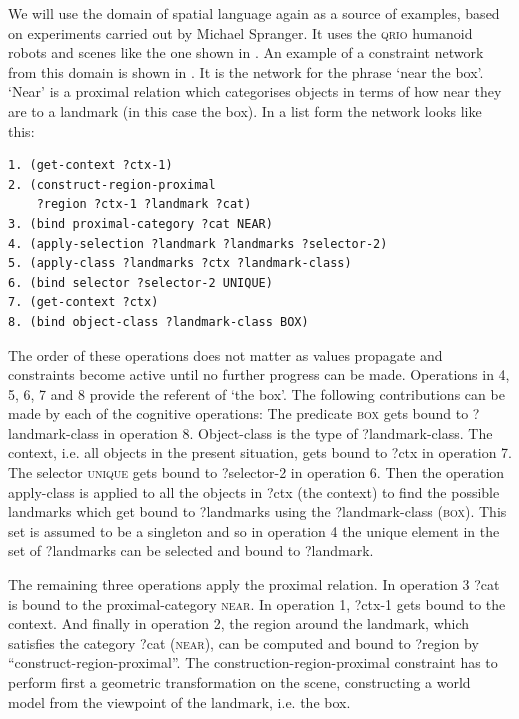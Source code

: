 We will use the domain of spatial language again as a source of examples, based on experiments carried out by 
Michael Spranger. It uses the \textsc{qrio} humanoid robots 
and scenes like the one shown in . An example of a constraint network from this domain 
is shown in . It is the network for the phrase `near the box'. `Near' is a proximal 
relation which categorises objects in terms of how near they are to a landmark (in this case the box). In a list form the 
network looks like this: 
\begin{small}
\begin{verbatim}
1. (get-context ?ctx-1) 
2. (construct-region-proximal 
    ?region ?ctx-1 ?landmark ?cat) 
3. (bind proximal-category ?cat NEAR) 
4. (apply-selection ?landmark ?landmarks ?selector-2)
5. (apply-class ?landmarks ?ctx ?landmark-class) 
6. (bind selector ?selector-2 UNIQUE) 
7. (get-context ?ctx) 
8. (bind object-class ?landmark-class BOX)
\end{verbatim}
\end{small}
The order of these operations does not matter as values propagate and constraints become active until no further progress
can be made. Operations in 4, 5, 6, 7 and 8 provide the referent of `the box'. The following contributions 
can be made by each of the cognitive operations: The predicate \textsc{box} gets bound to ?landmark-class in operation 8. Object-class is 
the type of ?landmark-class. The context, i.e. all objects in the present situation, gets bound to ?ctx in operation 7. 
The selector \textsc{unique} gets bound to ?selector-2 in operation 6. 
Then the operation apply-class is applied to all the objects in ?ctx (the context) to find the possible landmarks which 
get bound to ?landmarks using the ?landmark-class (\textsc{box}). This set is assumed to be a singleton and so 
in operation 4 the unique element in the set of ?landmarks can be selected 
and bound to ?landmark. 

\enlargethispage{1\baselineskip}
The remaining three operations apply the proximal relation. In operation 3 ?cat is bound to the proximal-category \textsc{near}. 
In operation 1, ?ctx-1 gets bound to 
the context. And finally in operation 2, the region around the landmark, which satisfies the category ?cat (\textsc{near}), can 
be computed and bound to ?region by ``construct-region-proximal''. The construction-region-proximal constraint has to perform first 
a geometric transformation on the scene, constructing a world model from the viewpoint of the landmark, i.e. the box. 


